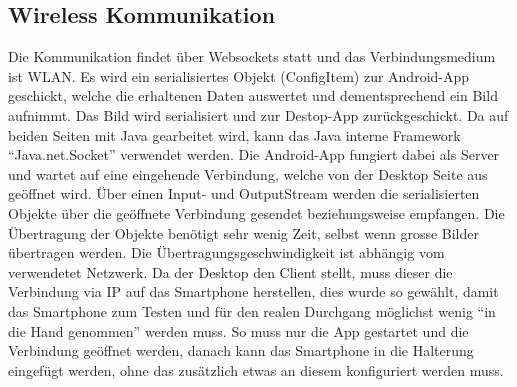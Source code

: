 \subsection{Wireless Kommunikation}

Die Kommunikation findet über Websockets statt und das Verbindungsmedium ist WLAN.
Es wird ein serialisiertes Objekt (ConfigItem) zur Android-App geschickt, welche die erhaltenen 
Daten auswertet und dementsprechend ein Bild aufnimmt. Das Bild wird serialisiert und zur 
Destop-App zurückgeschickt.
Da auf beiden Seiten mit Java gearbeitet wird, kann das Java interne Framework \enquote{Java.net.Socket} verwendet werden. 
Die Android-App fungiert dabei als Server und wartet auf eine eingehende Verbindung, welche von der 
Desktop Seite aus geöffnet wird. Über einen Input- und OutputStream werden die serialisierten Objekte 
über die geöffnete Verbindung gesendet beziehungsweise empfangen. Die Übertragung der Objekte benötigt sehr 
wenig Zeit, selbst wenn grosse Bilder übertragen werden. Die Übertragungsgeschwindigkeit ist abhängig vom verwendetet Netzwerk. 
Da der Desktop den Client stellt, muss dieser die Verbindung via IP auf das Smartphone herstellen, 
dies wurde so gewählt, damit das Smartphone zum Testen und für den realen Durchgang möglichst wenig 
\enquote{in die Hand genommen} werden muss. So muss nur die App gestartet und die Verbindung geöffnet werden, 
danach kann das Smartphone in die Halterung eingefügt werden, ohne das zusätzlich etwas an diesem konfiguriert werden muss. 

            
